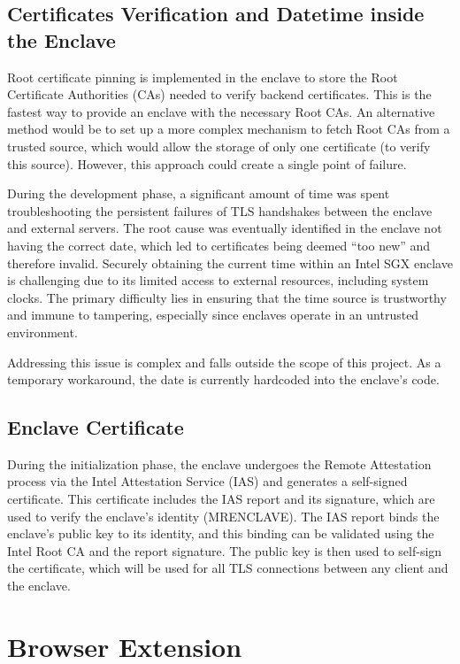 \subsection{Certificates Verification and Datetime inside the Enclave}
Root certificate pinning is implemented in the enclave to store the Root Certificate Authorities (CAs) needed to verify backend certificates. This is the fastest way to provide an enclave with the necessary Root CAs. An alternative method would be to set up a more complex mechanism to fetch Root CAs from a trusted source, which would allow the storage of only one certificate (to verify this source). However, this approach could create a single point of failure.

During the development phase, a significant amount of time was spent troubleshooting the persistent failures of TLS handshakes between the enclave and external servers. The root cause was eventually identified in the enclave not having the correct date, which led to certificates being deemed ``too new'' and therefore invalid. Securely obtaining the current time within an Intel SGX enclave is challenging due to its limited access to external resources, including system clocks. The primary difficulty lies in ensuring that the time source is trustworthy and immune to tampering, especially since enclaves operate in an untrusted environment.

Addressing this issue is complex and falls outside the scope of this project. As a temporary workaround, the date is currently hardcoded into the enclave's code.

\subsection{Enclave Certificate}
During the initialization phase, the enclave undergoes the Remote Attestation process via the Intel Attestation Service (IAS) and generates a self-signed certificate. This certificate includes the IAS report and its signature, which are used to verify the enclave's identity (MRENCLAVE). The IAS report binds the enclave's public key to its identity, and this binding can be validated using the Intel Root CA and the report signature. The public key is then used to self-sign the certificate, which will be used for all TLS connections between any client and the enclave.

\section{Browser Extension}

